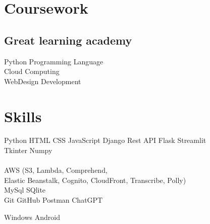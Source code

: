\documentclass[]{deedy-resume-openfont}
\begin{document}
\begin{minipage}[t]{0.33\textwidth}

\section{Coursework}
\subsection{Great learning academy}
Python Programming Language \\
Cloud Computing \\
WebDesign Development \\
\sectionsep



\section{Skills}
\textbullet{} Python  \textbullet{} HTML  \textbullet{} CSS  \textbullet{} JavaScript 
\textbullet{} Django  \textbullet{} Rest API  \textbullet{} Flask  \textbullet{} Streamlit \\ \textbullet{} Tkinter  \textbullet{} Numpy \\
\\
\textbullet{} AWS (S3, Lambda, Comprehend, \\Elastic Beanstalk, Cognito, CloudFront, Transcribe, Polly)\\
\textbullet{} MySql \textbullet{} SQlite \\
\textbullet{} Git  \textbullet{} GitHub  \textbullet{} Postman  \textbullet{} ChatGPT \\
\sectionsep

 \textbullet{} Windows \textbullet{} Android 
\sectionsep

%
%

\end{minipage} 
\hfill
\end{document}
